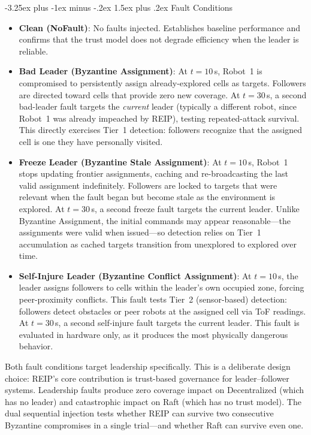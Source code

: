 \documentclass[conference]{IEEEtran}
\makeatletter
\renewcommand{\subsection}{\@startsection{subsection}{2}{\z@}%
  {-3.25ex plus -1ex minus -.2ex}%
  {1.5ex plus .2ex}%
  {\normalfont\normalsize\itshape\centering}}
\makeatother
\begin{document}
\subsection{Fault Conditions}

\begin{itemize}
    \item \textbf{Clean (NoFault)}: No faults injected. Establishes baseline performance and confirms that the trust model does not degrade efficiency when the leader is reliable.
    \item \textbf{Bad Leader (Byzantine Assignment)}: At $t{=}10\,$s, Robot~1 is compromised to persistently assign already-explored cells as targets. Followers are directed toward cells that provide zero new coverage. At $t{=}30\,$s, a second bad-leader fault targets the \emph{current} leader (typically a different robot, since Robot~1 was already impeached by REIP), testing repeated-attack survival. This directly exercises Tier~1 detection: followers recognize that the assigned cell is one they have personally visited.
    \item \textbf{Freeze Leader (Byzantine Stale Assignment)}: At $t{=}10\,$s, Robot~1 stops updating frontier assignments, caching and re-broadcasting the last valid assignment indefinitely. Followers are locked to targets that were relevant when the fault began but become stale as the environment is explored. At $t{=}30\,$s, a second freeze fault targets the current leader. Unlike Byzantine Assignment, the initial commands may appear reasonable---the assignments were valid when issued---so detection relies on Tier~1 accumulation as cached targets transition from unexplored to explored over time.
    \item \textbf{Self-Injure Leader (Byzantine Conflict Assignment)}: At $t{=}10\,$s, the leader assigns followers to cells within the leader's own occupied zone, forcing peer-proximity conflicts. This fault tests Tier~2 (sensor-based) detection: followers detect obstacles or peer robots at the assigned cell via ToF readings. At $t{=}30\,$s, a second self-injure fault targets the current leader. This fault is evaluated in hardware only, as it produces the most physically dangerous behavior.
\end{itemize}

Both fault conditions target leadership specifically. This is a deliberate design choice: REIP's core contribution is trust-based governance for leader--follower systems. Leadership faults produce zero coverage impact on Decentralized (which has no leader) and catastrophic impact on Raft (which has no trust model). The dual sequential injection tests whether REIP can survive two consecutive Byzantine compromises in a single trial---and whether Raft can survive even one.
\end{document}
